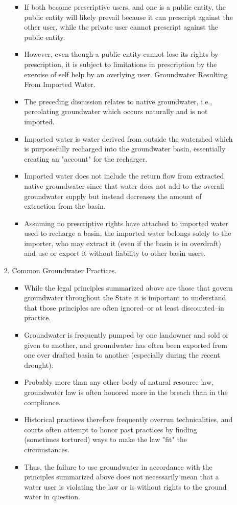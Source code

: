 \documentclass{article}
\begin{document}
\begin{enumerate}
\begin{itemize}
\begin{enumerate}
\begin{itemize}
\item If both become prescriptive users, and one is a public entity, the public entity will likely prevail because it can prescript against the other user, while the private user cannot prescript against the public entity. 
\item However, even though a public entity cannot lose its rights by prescription, it is subject to limitations in prescription by the exercise of self help by an overlying user. Groundwater Resulting From Imported Water. 
\item The preceding discussion relates to native groundwater, i.e., percolating groundwater which occurs naturally and is not imported. 
\item Imported water is water derived from outside the watershed which is purposefully recharged into the groundwater basin, essentially creating an "account" for the recharger. 
\item Imported water does not include the return flow from extracted native groundwater since that water does not add to the overall groundwater supply but instead decreases the amount of extraction from the basin. 
\item Assuming no prescriptive rights have attached to imported water used to recharge a basin, the imported water belongs solely to the importer, who may extract it (even if the basin is in overdraft) and use or export it without liability to other basin users. 
\end{itemize}
\item Common Groundwater Practices. 
\begin{itemize}
\item While the legal principles summarized above are those that govern groundwater throughout the State it is important to understand that those principles are often ignored--or at least discounted--in practice. 
\item Groundwater is frequently pumped by one landowner and sold or given to another, and groundwater has often been exported from one over drafted basin to another (especially during the recent drought). 
\item Probably more than any other body of natural resource law, groundwater law is often honored more in the breach than in the compliance. 
\item Historical practices therefore frequently overrun technicalities, and courts often attempt to honor past practices by finding (sometimes tortured) ways to make the law "fit" the circumstances. 
\item Thus, the failure to use groundwater in accordance with the principles summarized above does not necessarily mean that a water user is violating the law or is without rights to the ground water in question. 
\end{itemize}


\end{enumerate}
\end{itemize}
\end{enumerate}
\end{document}
